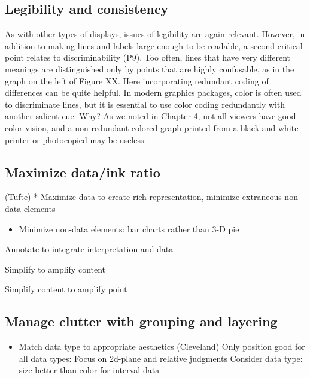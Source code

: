 \documentclass[]{krantz}
\providecommand{\tightlist}{%
  \setlength{\itemsep}{0pt}\setlength{\parskip}{0pt}}
\begin{document}
\hypertarget{legibility-and-consistency}{%
\subsection{Legibility and consistency}\label{legibility-and-consistency}}

As with other types of displays, issues of legibility are again relevant. However, in addition to making lines and labels large enough to be readable, a second critical point relates to discriminability (P9). Too often, lines that have very different meanings are distinguished only by points that are highly confusable, as in the graph on the left of Figure XX. Here incorporating redundant coding of differences can be quite helpful. In modern graphics packages, color is often used to discriminate lines, but it is essential to use color coding redundantly with another salient cue. Why? As we noted in Chapter 4, not all viewers have good color vision, and a non-redundant colored graph printed from a black and white printer or photocopied may be useless.

\hypertarget{maximize-dataink-ratio}{%
\subsection{Maximize data/ink ratio}\label{maximize-dataink-ratio}}

(Tufte)
* Maximize data to create rich representation, minimize extraneous non-data elements

\begin{itemize}
\tightlist
\item
  Minimize non-data elements: bar charts rather than 3-D pie
\end{itemize}

Annotate to integrate interpretation and data

Simplify to amplify content

Simplify content to amplify point

\hypertarget{manage-clutter-with-grouping-and-layering}{%
\subsection{Manage clutter with grouping and layering}\label{manage-clutter-with-grouping-and-layering}}

\begin{itemize}
\tightlist
\item
  Match data type to appropriate aesthetics (Cleveland)
  Only position good for all data types: Focus on 2d-plane and relative judgments
  Consider data type: size better than color for interval data
\end{itemize}
\end{document}
